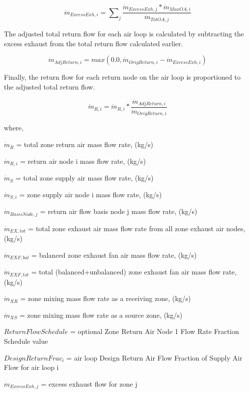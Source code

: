 \begin{equation}
{\dot m_{ExcessExh,i}} = {\sum\nolimits_{j} {\frac{\dot m_{ExcessExh,j} * \dot m_{MaxOA,i}} {\dot m_{TotOA,j}} }}
\end{equation}

The adjusted total return flow for each air loop is calculated by subtracting the excess exhaust from the total return flow calculated earlier.

\begin{equation}
\dot{m}_{AdjReturn,i} = max\left( 0.0, \dot{m}_{OrigReturn,i} - \dot{m}_{ExcessExh,i} \right)
\end{equation}

Finally, the return flow for each return node on the air loop is proportioned to the adjusted total return flow.

\begin{equation}
{\dot m_{R,i}} = {\dot m_{R,i}} * \frac{\dot m_{AdjReturn,i}} {\dot m_{OrigReturn,i}}
\end{equation}

where,

\({\dot m_{R}}\) = total zone return air mass flow rate, (kg/s)

\({\dot m_{R,i}}\) = return air node i mass flow rate, (kg/s)

\({\dot m_{S}}\) = total zone supply air mass flow rate, (kg/s)

\({\dot m_{S,i}}\) = zone supply air node i mass flow rate, (kg/s)

\({\dot m_{Basis Node,j}}\) = return air flow basis node j mass flow rate, (kg/s)

\({\dot m_{EX,tot}}\) = total zone exhaust air mass flow rate from all zone exhaust air nodes, (kg/s)

\({\dot m_{EXF,bal}}\) = balanced zone exhaust fan air mass flow rate, (kg/s)

\({\dot m_{EXF,tot}}\) = total (balanced+unbalanced) zone exhaust fan air mass flow rate, (kg/s)

\({\dot m_{XR}}\) = zone mixing mass flow rate as a receiving zone, (kg/s)

\({\dot m_{XS}}\) = zone mixing mass flow rate as a source zone, (kg/s)

\(ReturnFlowSchedule\) = optional Zone Return Air Node 1 Flow Rate Fraction Schedule value

\({DesignReturnFrac_i}\) = air loop Design Return Air Flow Fraction of Supply Air Flow for air loop i

\(\dot m_{ExcessExh,j}\) = excess exhaust flow for zone j

